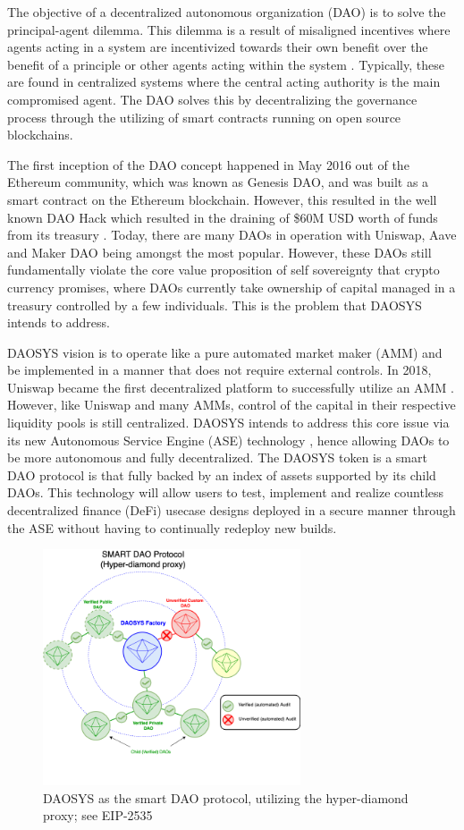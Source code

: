 \documentclass[journal,twocolumn,12pt]{ieeesyscoin}
\begin{document}
The objective of a decentralized autonomous organization (DAO) is to solve the principal-agent dilemma. This dilemma is a result of misaligned incentives where agents acting in a system are incentivized towards their own benefit over the benefit of a principle or other agents acting within the system \cite{San83}. Typically, these are found in centralized systems where the central acting authority is the main compromised agent. The DAO solves this by decentralizing the governance process through the utilizing of smart contracts running on open source blockchains.

The first inception of the DAO concept happened in May 2016 out of the Ethereum community, which was known as Genesis DAO, and was built as a smart contract on the Ethereum blockchain. However, this resulted in the well known DAO Hack which resulted in the draining of \$60M USD worth of funds from its treasury \cite{Sie22}. Today, there are many DAOs in operation with Uniswap, Aave and Maker DAO being amongst the most popular. However, these DAOs still fundamentally violate the core value proposition of self sovereignty that crypto currency promises, where DAOs currently take ownership of capital managed in a treasury controlled by a few individuals. This is the problem that DAOSYS intends to address.

DAOSYS vision is to operate like a pure automated market maker (AMM) and be implemented in a manner that does not require external controls. In 2018, Uniswap became the first decentralized platform to successfully utilize an AMM \cite{Uni19}. However, like Uniswap and many AMMs, control of the capital in their respective liquidity pools is still centralized. DAOSYS intends to address this core issue via its new Autonomous Service Engine (ASE) technology \cite{Sys22}, hence allowing DAOs to be more autonomous and fully decentralized. The DAOSYS token is a smart DAO protocol is that fully backed by an index of assets supported by its child DAOs. This technology will allow users to test, implement and realize countless decentralized finance (DeFi) usecase designs deployed in a secure manner through the ASE without having to continually redeploy new builds.

\begin{figure}[h!]
\includegraphics[width=3in]{img/smart_dao.png}
\caption{DAOSYS as the smart DAO protocol, utilizing the hyper-diamond proxy; see EIP-2535} 
\label{fig:daosys_protocol}
\end{figure}
\end{document}
